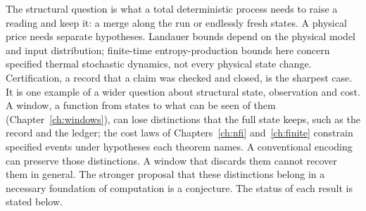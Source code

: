 \documentclass[11pt, a4paper]{report}
\theoremstyle{definition}
\theoremstyle{plain}
\begin{document}
The structural question is what a total deterministic process needs to raise a reading and keep it: a merge along the run or endlessly fresh states. A physical price needs separate hypotheses. Landauer bounds depend on the physical model and input distribution; finite-time entropy-production bounds here concern specified thermal stochastic dynamics, not every physical state change. Certification, a record that a claim was checked and closed, is the sharpest case. It is one example of a wider question about structural state, observation and cost. A window, a function from states to what can be seen of them (Chapter~\ref{ch:windows}), can lose distinctions that the full state keeps, such as the record and the ledger; the cost laws of Chapters~\ref{ch:nfi} and~\ref{ch:finite} constrain specified events under hypotheses each theorem names. A conventional encoding can preserve those distinctions. A window that discards them cannot recover them in general. The stronger proposal that these distinctions belong in a necessary foundation of computation is a conjecture. The status of each result is stated below.
\end{document}
